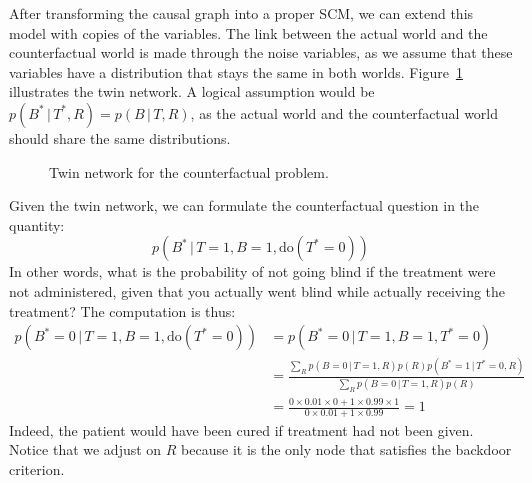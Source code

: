 \documentclass{article}
\newcommand{\giv}{\,|\,}
\begin{document}
After transforming the causal graph into a proper SCM, we can extend this model with copies of the variables. The link between the actual world and the counterfactual world is made through the noise variables, as we assume that these variables have a distribution that stays the same in both worlds. Figure~\ref{fig:cfex2} illustrates the twin network. A logical assumption would be $p(B^* \giv T^*, R) = p(B \giv T, R)$, as the actual world and the counterfactual world should share the same distributions. 

\begin{figure}[H]
    \centering
    
    \caption{Twin network for the counterfactual problem.}
    \label{fig:cfex2}
\end{figure}

\noindent Given the twin network, we can formulate the counterfactual question in the quantity:
$$
    p(B^* \giv T=1, B=1, \text{do}(T^*=0))
$$
\noindent In other words, what is the probability of not going blind if the treatment were not administered, given that you actually went blind while actually receiving the treatment? The computation is thus:
\begin{align*}
    p(B^*=0 \giv T=1, B=1, \text{do}(T^*=0)) &= p(B^*=0 \giv T=1, B=1, T^*=0)\\
    &= \frac{\sum_R p(B=0 \giv T=1, R)p(R)p(B^*=1 \giv T^*=0, R)}{\sum_R p(B=0 \giv T=1, R)p(R)}\\[1em]
    &= \frac{0 \times 0.01 \times 0 + 1 \times 0.99 \times 1}{0 \times 0.01 + 1 \times 0.99} = 1
\end{align*}
\noindent Indeed, the patient would have been cured if treatment had not been given. Notice that we adjust on $R$ because it is the only node that satisfies the backdoor criterion. 
\end{document}
